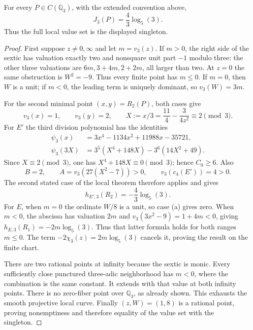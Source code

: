 \begin{theorem}
\label{lh-three}
For every \(P\in C(\mathbb Q_3)\), with the extended convention above,
\[
 J_3(P)=\frac43\log_5(3).
\]
Thus the full local value set is the displayed singleton.
\end{theorem}
\begin{proof}
First suppose \(z\ne0,\infty\) and let \(m=v_3(z)\).
If \(m>0\), the right side of the sextic has valuation exactly two
and nonsquare unit part \(-1\) modulo three: the other three
valuations are \(6m,3+4m,2+2m\), all larger than two.
At \(z=0\) the same obstruction is \(W^2=-9\).
Thus every finite point has \(m\le0\). If \(m=0\), then \(W\) is
a unit; if \(m<0\), the leading term is uniquely dominant, so
\(v_3(W)=3m\).

For the second minimal point \((x,y)=R_2(P)\), both cases give
\begin{equation}
 v_3(x)=1,\qquad v_3(y)=2,\qquad
 X:=x/3=\frac{11}4-\frac3{4z^2}\equiv2\pmod3.
 \label{lh-three-coordinates}
\end{equation}
For \(E'\) the third division polynomial has the identities
\begin{align}
 \psi_3(x)&=3x^4-1134x^2+11988x-35721,\\
 \psi_3(3X)&=3^5(X^4+148X)-3^6(14X^2+49).
 \label{lh-division-polynomial}
\end{align}
Since \(X\equiv2\pmod3\), one has \(X^4+148X\equiv0\pmod3\);
hence \(C_0\ge6\). Also
\[
 B=2,\qquad A=v_3(27(X^2-7))>0,\qquad v_3(c_4(E'))=4>0.
\]
The second stated case of the local theorem therefore applies and gives
\[
 h_{E',3}(R_2)=-\frac43\log_5(3).
\]
For \(E\), when \(m=0\) the ordinate \(W/8\) is a unit, so case (a)
gives zero. When \(m<0\), the abscissa has valuation \(2m\) and
\(v_3(3x^2-9)=1+4m<0\), giving
\(h_{E,3}(R_1)=-2m\log_5(3)\).
Thus that latter formula holds for both ranges \(m\le0\).
The term \(-2\chi_3(z)=2m\log_5(3)\) cancels it, proving the result
on the finite chart.

There are two rational points at infinity because the sextic is monic.
Every sufficiently close punctured three-adic neighborhood has \(m<0\),
where the combination is the same constant. It extends with that value
at both infinity points. There is no zero-fiber point over
\(\mathbb Q_3\), as already shown. This exhausts the smooth projective
local curve. Finally \((z,W)=(1,8)\) is a rational point, proving
nonemptiness and therefore equality of the value set with the singleton.
\end{proof}

